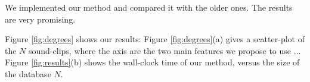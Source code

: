 We implemented our method
and compared it with the older ones.
The results are very promising.

Figure \ref{fig:degrees} shows our results:
Figure \ref{fig:degrees}(a) gives a scatter-plot
of the $N$ sound-clips, where the axis are the two main
features we propose to use $\ldots$
Figure \ref{fig:results}(b) shows the wall-clock time
of our method, versus the size of the database $N$.



